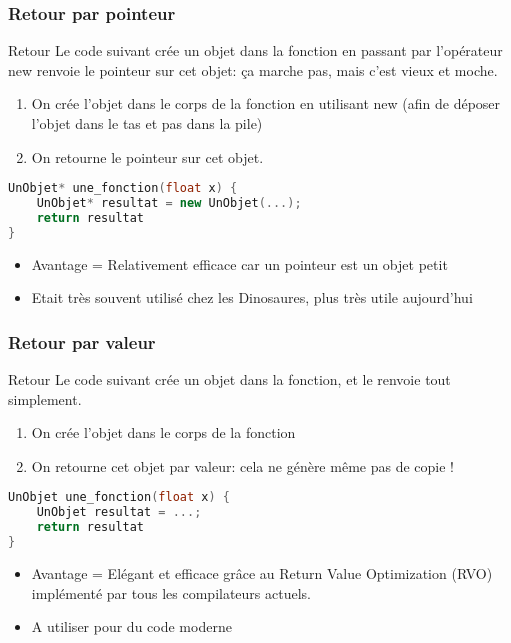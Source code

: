 \documentclass{beamer}
\begin{document}
\begin{frame}[fragile=singleslide,shrink=20]
\frametitle {Retour par pointeur}

\begin{block}{Retour \*}
Le code suivant crée un objet dans la fonction en passant par l'opérateur new renvoie le pointeur sur cet objet: ça marche pas, mais c'est vieux et moche.

\begin{enumerate}
\item On crée l'objet dans le corps de la fonction en utilisant new (afin de déposer l'objet dans le tas et pas dans la pile)
\item On retourne le pointeur sur cet objet.
\end{enumerate}
\end{block}

\begin{lstlisting}[language=c++]
UnObjet* une_fonction(float x) {
    UnObjet* resultat = new UnObjet(...);
    return resultat
}
\end{lstlisting}

\begin{itemize}
\item Avantage = Relativement efficace car un pointeur est un objet petit
\item Etait très souvent utilisé chez les Dinosaures, plus très utile aujourd'hui
\end{itemize}
\end{frame}

\begin{frame}[fragile=singleslide,shrink=20]
\frametitle {Retour par valeur}

\begin{block}{Retour \*}
Le code suivant crée un objet dans la fonction, et le renvoie tout simplement.

\begin{enumerate}
\item On crée l'objet dans le corps de la fonction
\item On retourne cet objet par valeur: cela ne génère même pas de copie !
\end{enumerate}
\end{block}

\begin{lstlisting}[language=c++]
UnObjet une_fonction(float x) {
    UnObjet resultat = ...;
    return resultat
}
\end{lstlisting}

\begin{itemize}
\item Avantage = Elégant et efficace grâce au Return Value Optimization (RVO) implémenté par tous les compilateurs actuels.
\item A utiliser pour du code moderne
\end{itemize}
\end{frame}
\end{document}
